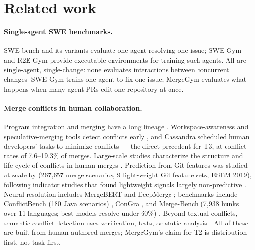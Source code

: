 \documentclass{article}
\begin{document}
\section{Related work}
\label{sec:related}

\paragraph{Single-agent SWE benchmarks.} SWE-bench and its variants \citep{jimenez2024swebench} evaluate one agent resolving one issue; SWE-Gym \citep{pan2025swegym} and R2E-Gym \citep{r2egym2025} provide executable environments for training such agents. All are single-agent, single-change: none evaluates interactions between concurrent changes. SWE-Gym trains one agent to fix one issue; MergeGym evaluates what happens when many agent PRs edit one repository at once.

\paragraph{Merge conflicts in human collaboration.} Program integration and merging have a long lineage \citep{horwitz1989integrating,mens2002survey}. Workspace-awareness and speculative-merging tools detect conflicts early \citep{sarma2012palantir,brun2011crystal}, and Cassandra scheduled human developers' tasks to minimize conflicts \citep{kasi2013cassandra} --- the direct precedent for T3, at conflict rates of 7.6--19.3\% of merges. %
Large-scale studies characterize the structure and life-cycle of conflicts in human merges \citep{ghiotto2020tse,nelson2019lifecycle}.
Prediction from Git features was studied at scale by \citet{owhadi2019predicting} (267{,}657 merge scenarios, 9 light-weight Git feature sets; ESEM 2019), following indicator studies that found lightweight signals largely non-predictive \citep{lessenich2018indicators}. %
Neural resolution includes MergeBERT \citep{svyatkovskiy2022mergebert} and DeepMerge \citep{dinella2021deepmerge}; benchmarks include ConflictBench (180 Java scenarios) \citep{shen2024conflictbench}, ConGra \citep{congra2024}, and Merge-Bench (7{,}938 hunks over 11 languages; best models resolve under 60\%) \citep{schesch2026mergebench}. %
Beyond textual conflicts, semantic-conflict detection uses verification, tests, or static analysis \citep{sousa2018safemerge,dasilva2024semantic,dejesus2023semantic}. All of these are built from human-authored merges; MergeGym's claim for T2 is distribution-first, not task-first.
\end{document}
